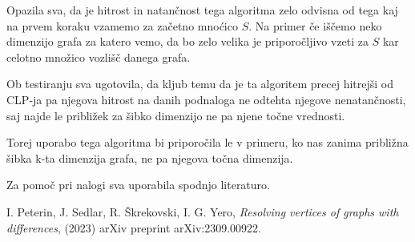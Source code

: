 \documentclass[12pt,a4paper]{amsart}
\theoremstyle{plain} %
\begin{document}
Opazila sva, da je hitrost in natančnost tega algoritma zelo odvisna od tega kaj na prvem koraku vzamemo za začetno mnoćico $S$. Na primer če iščemo neko dimenzijo grafa za katero vemo, da bo zelo velika je priporočljivo vzeti za $S$ kar celotno množico vozlišč danega grafa.

Ob testiranju sva ugotovila, da kljub temu da je ta algoritem precej hitrejši od CLP-ja pa njegova hitrost na danih podnaloga ne odtehta njegove nenatančnosti, saj najde le približek za šibko dimenzijo ne pa njene točne vrednosti.

Torej uporabo tega algoritma bi priporočila le v primeru, ko nas zanima približna šibka k-ta dimenzija grafa, ne pa njegova točna dimenzija. 

\bigskip

\bigskip
Za pomoč pri nalogi sva uporabila spodnjo literaturo.
\begin{thebibliography}{99}
    I. Peterin, J. Sedlar, R. Škrekovski, I. G. Yero,
    \emph{Resolving vertices of graphs with differences},
    (2023) arXiv preprint arXiv:2309.00922.
    \end{thebibliography}
\end{document}
